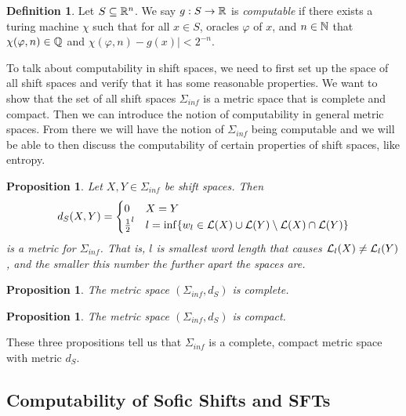 \documentclass[11pt, reqno]{amsart}
\theoremstyle{plain}
\numberwithin{thm}{subsection}
\newtheorem{prop}[thm]{Proposition}
\theoremstyle{definition}
\newtheorem{defn}[thm]{Definition}
\begin{document}
\begin{defn}
    Let $S \subseteq \mathbb{R}^n$. We say $g: S \rightarrow \mathbb{R}$ is \textit{computable} if there exists a turing machine $\chi$ such that for all $x \in S$, oracles $\varphi$ of $x$, and $n \in \mathbb{N}$ that $\chi(\varphi, n) \in \mathbb{Q}$ and $\chi(\varphi, n) - g(x)| < 2^{-n}$.
\end{defn}




\newpage %

To talk about computability in shift spaces, we need to first set up the space of all shift spaces and verify that it has some reasonable properties. We want to show that the set of all shift spaces $\Sigma_{inf}$ is a metric space that is complete and compact. Then we can  introduce the notion of computability in general metric spaces. From there we will have the notion of $\Sigma_{inf}$ being computable and we will be able to then discuss the computability of certain properties of shift spaces, like entropy.

\begin{prop}
  Let $X, Y \in \Sigma_{inf}$ be shift spaces. Then
  $$d_S(X,Y) = \begin{cases}
      0 & X = Y \\ 
      \frac{1}{2}^l & l = \inf \{w_l \in \mathcal{L}(X) \cup \mathcal{L}(Y) \setminus \mathcal{L}(X) \cap \mathcal{L}(Y)\}
  \end{cases}$$
  is a metric for $\Sigma_{inf}$. That is, $l$ is smallest word length that causes $\mathcal{L}_l(X) \neq \mathcal{L}_l(Y)$, and the smaller this number the further apart the spaces are.
\end{prop}

\begin{prop}
  The metric space $(\Sigma_{inf}, d_S)$ is complete.
\end{prop}

\begin{prop}
  The metric space $(\Sigma_{inf}, d_S)$ is compact.
\end{prop}

These three propositions tell us that $\Sigma_{inf}$ is a complete, compact metric space with metric $d_S$. 





\subsection{Computability of Sofic Shifts and SFTs}\cite[L7]{wolf}  
\end{document}
